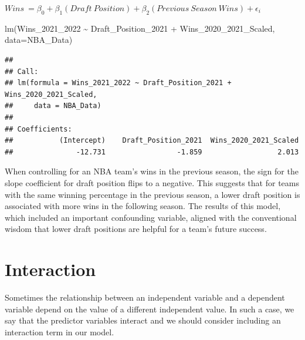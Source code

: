 \documentclass[
  11pt,
]{book}
\newenvironment{Shaded}{\begin{snugshade}}{\end{snugshade}}
\newcommand{\AttributeTok}[1]{\textcolor[rgb]{0.77,0.63,0.00}{#1}}
\newcommand{\FunctionTok}[1]{\textcolor[rgb]{0.00,0.00,0.00}{#1}}
\newcommand{\NormalTok}[1]{#1}
\newcommand{\SpecialCharTok}[1]{\textcolor[rgb]{0.00,0.00,0.00}{#1}}
\theoremstyle{definition}
\theoremstyle{definition}
\theoremstyle{definition}
\theoremstyle{definition}
\theoremstyle{remark}
\begin{document}
\(Wins\ = \beta_0 + \beta_1(Draft\ Position) + \beta_2(Previous\ Season\ Wins) + \epsilon_i\)

\begin{Shaded}
\begin{Highlighting}[]
\FunctionTok{lm}\NormalTok{(Wins\_2021\_2022 }\SpecialCharTok{\textasciitilde{}}\NormalTok{ Draft\_Position\_2021 }\SpecialCharTok{+}\NormalTok{ Wins\_2020\_2021\_Scaled, }\AttributeTok{data=}\NormalTok{NBA\_Data)}
\end{Highlighting}
\end{Shaded}

\begin{verbatim}
## 
## Call:
## lm(formula = Wins_2021_2022 ~ Draft_Position_2021 + Wins_2020_2021_Scaled, 
##     data = NBA_Data)
## 
## Coefficients:
##           (Intercept)    Draft_Position_2021  Wins_2020_2021_Scaled  
##               -12.731                 -1.859                  2.013
\end{verbatim}

When controlling for an NBA team's wins in the previous season, the sign for the slope coefficient for draft position flips to a negative. This suggests that for teams with the same winning percentage in the previous season, a lower draft position is associated with more wins in the following season. The results of this model, which included an important confounding variable, aligned with the conventional wisdom that lower draft positions are helpful for a team's future success.

\newpage

\hypertarget{interaction}{%
\section{Interaction}\label{interaction}}

Sometimes the relationship between an independent variable and a dependent variable depend on the value of a different independent value. In such a case, we say that the predictor variables interact and we should consider including an interaction term in our model.
\end{document}
